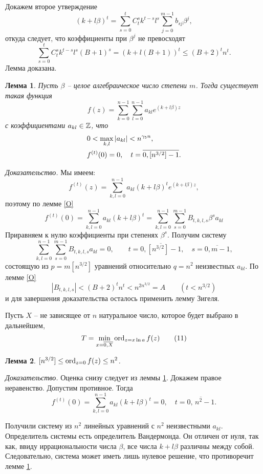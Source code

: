 \documentclass[12pt]{article}
\newtheorem{lemma}{Лемма}
\let\ol\overline
\begin{document}
Докажем второе утверждение
$$
(k+l\beta)^t=\sum_{s=0}^tC_t^sk^{t-s}l^s\sum_{j=0}^{m-1}b_{sj}\beta^j,
$$
откуда следует, что коэффициенты при $\beta^j$ не превосходят
$$
\sum_{s=0}^tC_t^sk^{t-s}l^s(B+1)^s=(k+l(B+1))^t \le (B+2)^tn^t.
$$
Лемма доказана.

 \begin{lemma}\label{P} Пусть $\beta$  -- целое алгебраическое число
степени $m$. Тогда существует такая функция
$$
f(z)=\sum_{k=0}^{n-1} \sum_{l=0}^{n-1} a_{kl} e^{(k+l\beta)z}
$$
с коэффициентами $a_{kl} \in \Bbb Z$, что
$$
\aligned &
0 < \max_{k,l} |a_{kl}| < n^{\gamma_5n}, \\
& f^{(t)}(0)=0, \quad t= \ol {0,[n^{3/2}]-1}.
\endaligned
$$
\end{lemma}



\emph{Доказательство.} Мы имеем:
\begin{equation}\label{9}
f^{(t)}(z)=\sum_{k,l=0}^{n-1}a_{kl}(k+l\beta)^te^{(k+l\beta)z},
\end{equation}
 поэтому по лемме \ref{O}
$$
f^{(t)}(0)=\sum_{k,l=0}^{n-1}a_{kl}(k+l\beta)^t=
\sum_{k,l=0}^{n-1}\sum_{s=0}^{m-1}B_{t,k,l,s}\beta^sa_{kl}
$$
Приравняем к нулю коэффициенты при степенях $\beta^s$. Получим
систему
$$
\sum_{k,l=0}^{n-1}\sum_{s=0}^{m-1}B_{t,k,l,s}a_{kl}=0, \qquad
t=\ol{0,[n^{3/2}]-1}, \quad s=\ol{0,m-1},
$$
состоящую из $p=m[n^{3/2}]$   уравнений
относительно $q=n^2$ неизвестных $a_{kl}$.  По
лемме \ref{O}
$$
|B_{t,k,l,s}|<(B+2)^tn^t<n^{2n^{3/2}}=A \qquad (t<n^{3/2})
$$
и для завершения доказательства осталось применить лемму Зигеля.

Пусть $X$  -- не зависящее от $n$ натуральное число, которое будет
выбрано в дальнейшем,
\begin{equation}\label{10}
T=\min_{x=\ol{0,X}}\ord_{z=x \ln a}f(z) \tag {11}
\end{equation}


 \begin{lemma}\label{R}  $[n^{3/2}] \leq \operatorname{ord}_{z=0}f(z) \leq n^2$.
\end{lemma}

\emph{Доказательство.} Оценка снизу следует из
леммы \ref{P}. Докажем правое неравенство.
Допустим противное. Тогда
$$
f^{(t)}(0)=\sum_{k,l=0}^{n-1}a_{kl}(k+l\beta)^t= 0, \quad t=\ol
{0, \,n^2-1}.
$$

Получили систему из $n^2$ линейных уравнений с
$n^2$  неизвестными $a_{kl}$. Определитель
системы есть определитель Вандермонда. Он отличен
от нуля, так как, ввиду иррациональности числа
$\beta$, все числа $k+l\beta$ различны между
собой. Следовательно, система может иметь лишь
нулевое решение, что противоречит лемме \ref{P}.
\end{document}
